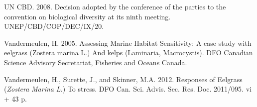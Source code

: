 \documentclass[12pt]{article}\usepackage[]{graphicx}\usepackage[]{color}
\begin{document}
\begin{CSLReferences}{1}{0}
%
UN CBD. 2008. Decision adopted by the conference of the parties to the convention on biological diversity at its ninth meeting. UNEP/CBD/COP/DEC/IX/20.

%
Vandermeulen, H. 2005. Assessing {Marine Habitat Sensitivity}: {A} case study with eelgrass ({Zostera} marina {L}.) And kelps ({Laminaria}, {Macrocystis}). {DFO Canadian Science Advisory Secretariat, Fisheries and Oceans Canada}.

%
Vandermeulen, H., Surette, J., and Skinner, M.A. 2012. Responses of {Eelgrass} ({\emph{Zostera}}{ \emph{Marina} }{\emph{L}}{\emph{.}}) To stress. DFO Can. Sci. Advis. Sec. Res. Doc. 2011/095. vi + 43 p.

\end{CSLReferences}
\end{document}
